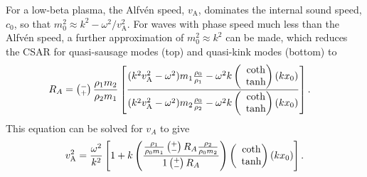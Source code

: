 \documentclass[namedreferences]{solarphysics}
\numberwithin{equation}{section}
\begin{document}
\begin{article}
For a low-beta plasma, the Alfv\'{e}n speed, $v_\textrm{A}$, dominates the internal sound speed, $c_0$, so that $m_0^2 \approx k^2-\omega^2/v_\textrm{A}^2$. For waves with phase speed much less than the Alfv\'{e}n speed, a further approximation of $m_0^2 \approx k^2$ can be made, which reduces the CSAR for quasi-sausage modes (top) and quasi-kink modes (bottom) to
\begin{align}
R_A &= \left(\substack{- \\ +}\right) \frac{\rho_1m_2}{\rho_2m_1} \left[ \frac{(k^2v_\textrm{A}^2-\omega^2)m_1\frac{\rho_0}{\rho_1}-\omega^2k \left(\hspace{-0.07in}\begin{matrix} &\coth \\ &\tanh \end{matrix}\right)(kx_0)}{(k^2v_\textrm{A}^2-\omega^2)m_2\frac{\rho_0}{\rho_2}-\omega^2k \left(\hspace{-0.07in}\begin{matrix} &\coth \\ &\tanh \end{matrix}\right)(kx_0)} \right].
\end{align}
This equation can be solved for $v_A$ to give
\begin{equation}
v_\textrm{A}^2 = \frac{\omega^2}{k^2} \left[1 + k \left( \frac{ \frac{\rho_1}{\rho_0m_1} \left(\substack{+ \\ -}\right) R_A\frac{\rho_2}{\rho_0m_2}}{1 \left(\substack{+ \\ -}\right) R_A} \right) \left(\hspace{-0.07in}\begin{matrix} &\coth \\ &\tanh \end{matrix}\right) (kx_0)\right].
\end{equation}




\end{article}
\end{document}
